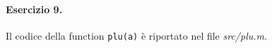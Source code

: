 \paragraph{Esercizio 9.} Il codice della function \verb|plu(a)| è riportato nel file \emph{src/plu.m}.